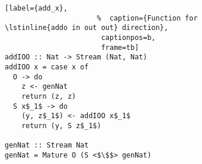 \begin{figure}[!t]
  \centering
  \begin{minipage}{\columnwidth}
    \begin{lstlisting}[label={add_x},
                      %  caption={Function for \lstinline{addo in out out} direction},
                       captionpos=b,
                       frame=tb]
addIOO :: Nat -> Stream (Nat, Nat)
addIOO x = case x of
  O -> do
    z <- genNat
    return (z, z)
  S x$_1$ -> do
    (y, z$_1$) <- addIOO x$_1$
    return (y, S z$_1$)

genNat :: Stream Nat
genNat = Mature O (S <$\$$> genNat)
    \end{lstlisting}
  \end{minipage}
\end{figure}